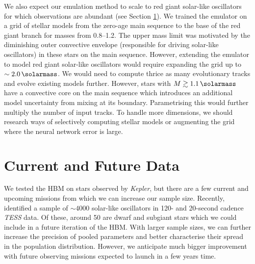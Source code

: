 We also expect our emulation method to scale to red giant solar-like oscillators for which observations are abundant (see Section \ref{sec:conc-future}). We trained the emulator on a grid of stellar models from the zero-age main sequence to the base of the red giant branch for masses from \SIrange{0.8}{1.2}{\solarmass}. The upper mass limit was motivated by the diminishing outer convective envelope (responsible for driving solar-like oscillators) in these stars on the main sequence. However, extending the emulator to model red giant solar-like oscillators would require expanding the grid up to \(\sim\SI{2.0}{\solarmass}\). We would need to compute thrice as many evolutionary tracks and evolve existing models further. However, stars with \(M \gtrsim \SI{1.1}{\solarmass}\) have a convective core on the main sequence which introduces an additional model uncertainty from mixing at its boundary. Parametrising this would further multiply the number of input tracks. To handle more dimensions, we should research ways of selectively computing stellar models or augmenting the grid \citep[e.g.][]{Li.Davies.ea2022} where the neural network error is large.


\section{Current and Future Data}\label{sec:conc-future}

We tested the HBM on stars observed by \emph{Kepler}, but there are a few current and upcoming missions from which we can increase our sample size. Recently, \citet{Hatt.Nielsen.ea2023} identified a sample of \(\sim 4000\) solar-like oscillators in 120- and 20-second cadence \emph{TESS} data. Of these, around 50  are dwarf and subgiant stars which we could include in a future iteration of the HBM. With larger sample sizes, we can further increase the precision of pooled parameters and better characterise their spread in the population distribution. However, we anticipate much bigger improvement with future observing missions expected to launch in a few years time.

